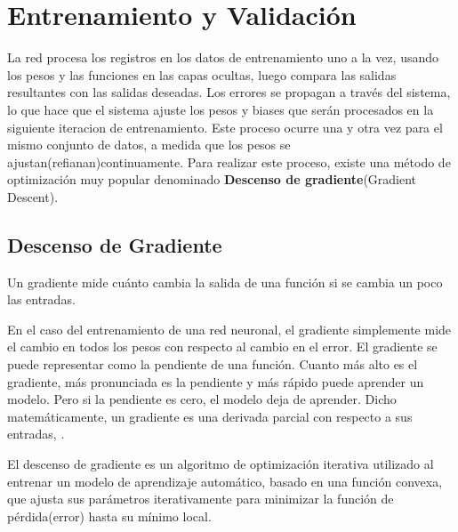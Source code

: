 \section{Entrenamiento y Validación}

	La red procesa los registros en los datos de entrenamiento uno a la vez, usando los pesos y las funciones en las capas ocultas, luego compara las salidas resultantes con las salidas deseadas. Los errores se propagan a través del sistema, lo que hace que el sistema ajuste los pesos y biases que serán procesados en la siguiente iteracion de entrenamiento. Este proceso ocurre una y otra vez para el mismo conjunto de datos, a medida que los pesos se ajustan(refianan)continuamente. Para realizar este proceso, existe una método de optimización muy popular denominado {\bf Descenso de gradiente}(Gradient Descent).

	\subsection{Descenso de Gradiente}

		Un gradiente mide cuánto cambia la salida de una función si se cambia un poco las entradas.

		En el caso del entrenamiento de una red neuronal, el gradiente simplemente mide el cambio en todos los pesos con respecto al cambio en el error. El gradiente se puede representar como la pendiente de una función. Cuanto más alto es el gradiente, más pronunciada es la pendiente y más rápido puede aprender un modelo. Pero si la pendiente es cero, el modelo deja de aprender. Dicho matemáticamente, un gradiente es una derivada parcial con respecto a sus entradas, \citep{gradient}.

		El descenso de gradiente es un algoritmo de optimización iterativa utilizado al entrenar un modelo de aprendizaje automático, basado en una función convexa, que ajusta sus parámetros iterativamente para minimizar la función de pérdida(error) hasta su mínimo local.\citep{gradient}

